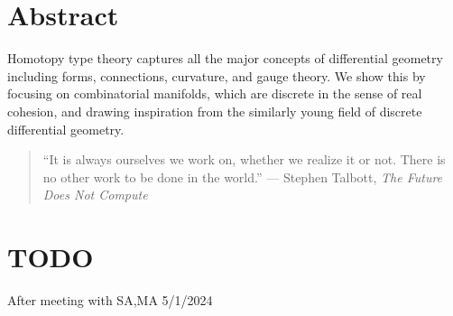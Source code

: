 \usepackage{greg}
\maketitle

\bgroup 

\section*{Abstract}\label{abstract}

Homotopy type theory captures all the major concepts of differential
geometry including forms, connections, curvature, and gauge theory. We
show this by focusing on combinatorial manifolds, which are discrete in
the sense of real cohesion\cite{shulman_cohesion}, and drawing
inspiration from the similarly young field of discrete differential
geometry.

\egroup 

\begin{quote}
\centering

``It is always ourselves we work on, whether we realize it or not. There
is no other work to be done in the world.'' --- Stephen Talbott,
\emph{The Future Does Not Compute}\cite{talbott}
\end{quote}

\section{TODO}\label{todo}

After meeting with SA,MA 5/1/2024

